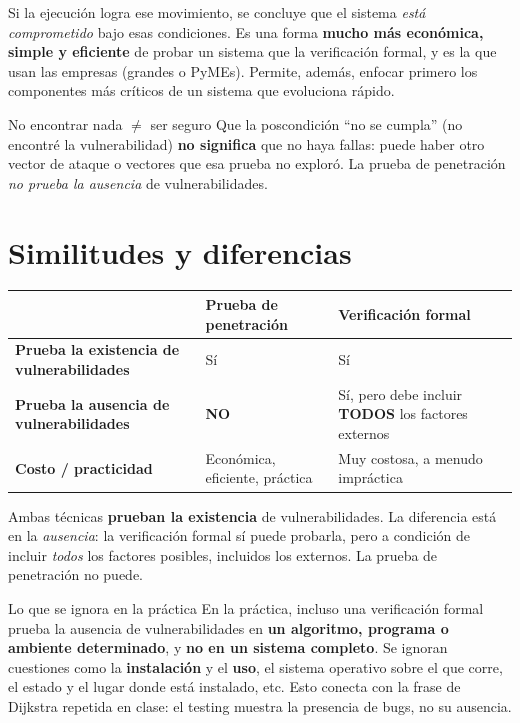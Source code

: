 \documentclass[11pt,a4paper]{article}
\begin{document}
Si la ejecución logra ese movimiento, se concluye que el sistema \emph{está comprometido}
bajo esas condiciones. Es una forma \textbf{mucho más económica, simple y eficiente} de
probar un sistema que la verificación formal, y es la que usan las empresas (grandes o
PyMEs). Permite, además, enfocar primero los componentes más críticos de un sistema que
evoluciona rápido.

\begin{warnbox}{No encontrar nada $\neq$ ser seguro}
Que la poscondición ``no se cumpla'' (no encontré la vulnerabilidad) \textbf{no significa}
que no haya fallas: puede haber otro vector de ataque o vectores que esa prueba no exploró.
La prueba de penetración \emph{no prueba la ausencia} de vulnerabilidades.
\end{warnbox}

\section{Similitudes y diferencias}

\begin{center}
\renewcommand{\arraystretch}{1.35}
\begin{tabular}{>{\raggedright\arraybackslash}p{4.0cm} >{\raggedright\arraybackslash}p{5.0cm} >{\raggedright\arraybackslash}p{5.0cm}}
\toprule
 & \textbf{Prueba de penetración} & \textbf{Verificación formal} \\
\midrule
\textbf{Prueba la existencia de vulnerabilidades} & Sí & Sí \\
\textbf{Prueba la ausencia de vulnerabilidades} & \textcolor{attackRed}{\textbf{NO}} & Sí, pero debe incluir \textbf{TODOS} los factores externos \\
\textbf{Costo / practicidad} & Económica, eficiente, práctica & Muy costosa, a menudo impráctica \\
\bottomrule
\end{tabular}
\end{center}

\medskip
\noindent Ambas técnicas \textbf{prueban la existencia} de vulnerabilidades. La diferencia
está en la \emph{ausencia}: la verificación formal sí puede probarla, pero a condición de
incluir \emph{todos} los factores posibles, incluidos los externos. La prueba de penetración
no puede.

\begin{notebox}{Lo que se ignora en la práctica}
En la práctica, incluso una verificación formal prueba la ausencia de vulnerabilidades en
\textbf{un algoritmo, programa o ambiente determinado}, y \textbf{no en un sistema completo}.
Se ignoran cuestiones como la \textbf{instalación} y el \textbf{uso}, el sistema operativo
sobre el que corre, el estado y el lugar donde está instalado, etc. Esto conecta con la frase
de Dijkstra repetida en clase: el testing muestra la presencia de bugs, no su ausencia.
\end{notebox}
\end{document}
